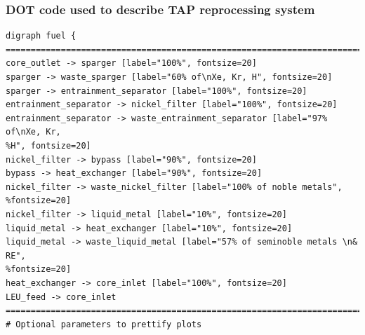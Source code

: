 \begin{frame}[fragile]
\frametitle{DOT code used to describe TAP reprocessing system}
\small
\begin{verbatim}
digraph fuel {
==============================================================================
core_outlet -> sparger [label="100%", fontsize=20]
sparger -> waste_sparger [label="60% of\nXe, Kr, H", fontsize=20]
sparger -> entrainment_separator [label="100%", fontsize=20]
entrainment_separator -> nickel_filter [label="100%", fontsize=20]
entrainment_separator -> waste_entrainment_separator [label="97% of\nXe, Kr, 
%H", fontsize=20]
nickel_filter -> bypass [label="90%", fontsize=20]
bypass -> heat_exchanger [label="90%", fontsize=20]
nickel_filter -> waste_nickel_filter [label="100% of noble metals", 
%fontsize=20]
nickel_filter -> liquid_metal [label="10%", fontsize=20]
liquid_metal -> heat_exchanger [label="10%", fontsize=20]
liquid_metal -> waste_liquid_metal [label="57% of seminoble metals \n& RE", 
%fontsize=20]
heat_exchanger -> core_inlet [label="100%", fontsize=20]
LEU_feed -> core_inlet
==============================================================================
# Optional parameters to prettify plots
\end{verbatim}
\end{frame}